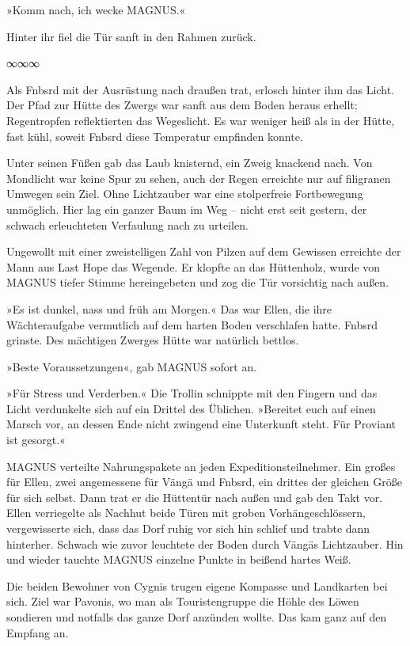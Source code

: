 »Komm nach, ich wecke MAGNUS.«

Hinter ihr fiel die Tür sanft in den Rahmen zurück.

\begin{center}
∞∞∞
\end{center}

Als Fnbsrd mit der Ausrüstung nach draußen trat, erlosch hinter ihm das Licht. Der Pfad zur Hütte des Zwergs war sanft aus dem Boden heraus erhellt; Regentropfen reflektierten das Wegeslicht. Es war weniger heiß als in der Hütte, fast kühl, soweit Fnbsrd diese Temperatur empfinden konnte.

Unter seinen Füßen gab das Laub knisternd, ein Zweig knackend nach. Von Mondlicht war keine Spur zu sehen, auch der Regen erreichte nur auf filigranen Umwegen sein Ziel. Ohne Lichtzauber war eine stolperfreie Fortbewegung unmöglich. Hier lag ein ganzer Baum im Weg – nicht erst seit gestern, der schwach erleuchteten Verfaulung nach zu urteilen.

Ungewollt mit einer zweistelligen Zahl von Pilzen auf dem Gewissen erreichte der Mann aus Last Hope das Wegende. Er klopfte an das Hüttenholz, wurde von MAGNUS tiefer Stimme hereingebeten und zog die Tür vorsichtig nach außen.

»Es ist dunkel, nass und früh am Morgen.« Das war Ellen, die ihre Wächteraufgabe vermutlich auf dem harten Boden verschlafen hatte. Fnbsrd grinste. Des mächtigen Zwerges Hütte war natürlich bettlos.

»Beste Voraussetzungen«, gab MAGNUS sofort an.

»Für Stress und Verderben.« Die Trollin schnippte mit den Fingern und das Licht verdunkelte sich auf ein Drittel des Üblichen. »Bereitet euch auf einen Marsch vor, an dessen Ende nicht zwingend eine Unterkunft steht. Für Proviant ist gesorgt.«

MAGNUS verteilte Nahrungspakete an jeden Expeditionsteilnehmer. Ein großes für Ellen, zwei angemessene für Vängä und Fnbsrd, ein drittes der gleichen Größe für sich selbst. Dann trat er die Hüttentür nach außen und gab den Takt vor. Ellen verriegelte als Nachhut beide Türen mit groben Vorhängeschlössern, vergewisserte sich, dass das Dorf ruhig vor sich hin schlief und trabte dann hinterher. Schwach wie zuvor leuchtete der Boden durch Vängäs Lichtzauber. Hin und wieder tauchte MAGNUS einzelne Punkte in beißend hartes Weiß.

Die beiden Bewohner von Cygnis trugen eigene Kompasse und Landkarten bei sich. Ziel war Pavonis, wo man als Touristengruppe die Höhle des Löwen sondieren und notfalls das ganze Dorf anzünden wollte. Das kam ganz auf den Empfang an.


